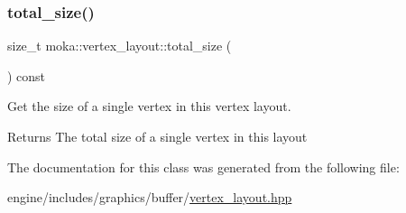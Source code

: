 \mbox{\label{classmoka_1_1vertex__layout_aa501fb01d39fcb5cb632f81e4b729e42}} 
\subsubsection{\texorpdfstring{total\_size()}{total\_size()}}
{\footnotesize\ttfamily size\+\_\+t moka\+::vertex\+\_\+layout\+::total\+\_\+size (\begin{DoxyParamCaption}{ }\end{DoxyParamCaption}) const\hspace{0.3cm}{\ttfamily [noexcept]}}



Get the size of a single vertex in this vertex layout. 

\begin{DoxyReturn}{Returns}
The total size of a single vertex in this layout 
\end{DoxyReturn}


The documentation for this class was generated from the following file\+:\begin{DoxyCompactItemize}
\item 
engine/includes/graphics/buffer/\mbox{\hyperlink{vertex__layout_8hpp}{vertex\+\_\+layout.\+hpp}}\end{DoxyCompactItemize}
